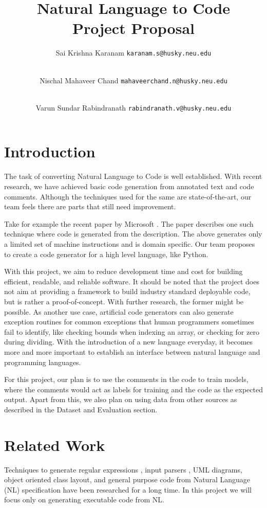 \documentclass{IEEEtran}
\title{\textbf{Natural Language to Code \\ \large{Project Proposal}}}
\author{
    Sai Krishna Karanam 
    \texttt{karanam.s@husky.neu.edu}
    \and \\
    Nischal Mahaveer Chand 
    \texttt{mahaveerchand.n@husky.neu.edu}
    \and \\
    Varun Sundar Rabindranath 
    \texttt{rabindranath.v@husky.neu.edu}
}
\date{}
\begin{document}
    \maketitle

    \section{Introduction}

    The task of converting Natural Language to Code is well established. With recent
    research, we have achieved basic code generation from annotated text and
    code comments. Although the techniques used for the same are state-of-the-art, our
    team feels there are parts that still need improvement.

    Take for example the recent paper by Microsoft \cite{balog2016deepcoder}. The paper 
    describes one such technique where code is generated from the description.
    The above generates only a limited set of machine instructions and is domain specific.
    Our team proposes to create a code generator for a high level language, like Python.
    
    With this project, we aim to reduce development time and cost for building efficient, 
    readable, and reliable software. It should be noted that the project does not aim at 
    providing a framework to build industry standard deployable code, but is rather a 
    proof-of-concept. With further research, the former might be possible. 
    As another use case, artificial code generators can also generate exception routines
    for common exceptions that human programmers sometimes fail to identify, like checking 
    bounds when indexing an array, or checking for zero during dividing.
    With the introduction of a new language everyday, it becomes more and more important
    to establish an interface between natural language and programming languages.

    For this project, our plan is to use the comments in the code to train models, 
    where the comments would act as labels for training and the code as the expected 
    output. Apart from this, we also plan on using data from other sources as described 
    in the Dataset and Evaluation section.
    
    \section{Related Work}
    Techniques to generate regular expressions \cite{kushman2013using}, input parsers 
    \cite{lei2013natural}, 
    UML diagrams, 
    object oriented class layout, and general purpose code from Natural Language (NL) 
    specification have been researched for a long time. In this project we will focus only 
    on generating executable code from NL.
\end{document}
